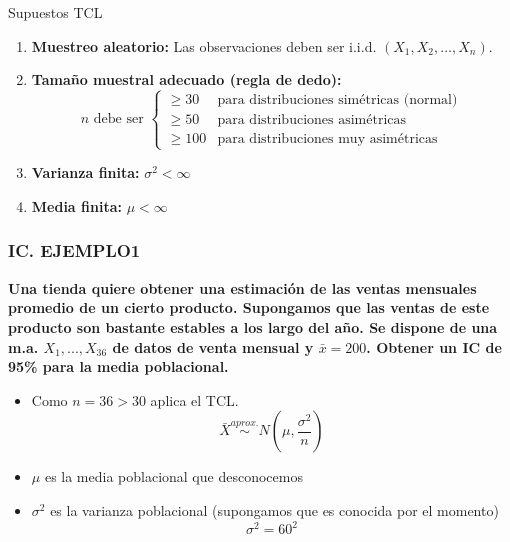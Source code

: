 \documentclass{beamer}
\begin{document}
\begin{frame}{Supuestos TCL}
    

\begin{enumerate}
    \item \textbf{Muestreo aleatorio:} Las observaciones deben ser i.i.d. $(X_1, X_2, \ldots, X_n)$.
    
    \item \textbf{Tamaño muestral adecuado (regla de dedo):} 
    $$n \text{ debe ser } \begin{cases}
        \geq 30 & \text{para distribuciones simétricas (normal)} \\
        \geq 50 & \text{para distribuciones  asimétricas} \\
        \geq 100 & \text{para distribuciones muy asimétricas} 
    \end{cases}$$
    
    \item \textbf{Varianza finita:} $\sigma^2 < \infty$
    
    \item \textbf{Media finita:} $\mu < \infty$
\end{enumerate}
\end{frame}

\begin{frame}
\frametitle{IC. EJEMPLO1}
\textbf{Una tienda quiere obtener una estimación de las ventas mensuales promedio de un cierto producto. Supongamos que las ventas de este producto son bastante estables a los largo del año. Se dispone de una m.a. $X_1,...,X_{36}$ de datos de venta mensual y $\bar{x}=200$. Obtener un IC de 95\% para la media poblacional.
}\begin{itemize}
\item Como $n=36>30$  aplica el TCL.
$$\bar{X} \stackrel{aprox.}\sim N(\mu,\frac{\sigma^2}{n})$$
\item $\mu$ es la media poblacional que desconocemos
\item $\sigma^2$ es la varianza poblacional (supongamos que es conocida por el momento)
$$\sigma^2=60^2$$
\end{itemize}
\end{frame}


\end{document}
